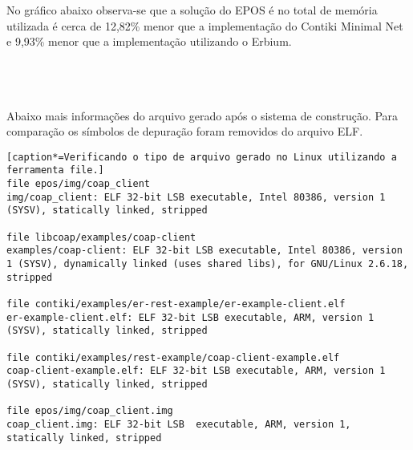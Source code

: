 No gr\'afico abaixo observa-se que a solu\c{c}\~ao do EPOS \'e no total de mem\'oria utilizada \'e cerca de 12,82\% menor que a implementa\c{c}\~ao do Contiki Minimal Net e 9,93\% menor que a implementa\c{c}\~ao utilizando o Erbium.
\\\\
\\\\

Abaixo mais informa\c{c}\~oes do arquivo gerado ap\'os o sistema de constru\c{c}\~ao. Para compara\c{c}\~ao os s\'imbolos de depura\c{c}\~ao foram removidos do arquivo ELF.

\begin{lstlisting}[caption*=Verificando o tipo de arquivo gerado no Linux utilizando a ferramenta file.]
file epos/img/coap_client
img/coap_client: ELF 32-bit LSB executable, Intel 80386, version 1 (SYSV), statically linked, stripped

file libcoap/examples/coap-client
examples/coap-client: ELF 32-bit LSB executable, Intel 80386, version 1 (SYSV), dynamically linked (uses shared libs), for GNU/Linux 2.6.18, stripped

file contiki/examples/er-rest-example/er-example-client.elf
er-example-client.elf: ELF 32-bit LSB executable, ARM, version 1 (SYSV), statically linked, stripped

file contiki/examples/rest-example/coap-client-example.elf 
coap-client-example.elf: ELF 32-bit LSB executable, ARM, version 1 (SYSV), statically linked, stripped

file epos/img/coap_client.img 
coap_client.img: ELF 32-bit LSB  executable, ARM, version 1, statically linked, stripped
\end{lstlisting}

